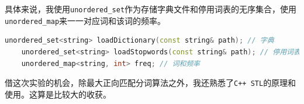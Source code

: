 \documentclass{article}
\begin{document}
具体来说，我使用\texttt{unordered\_set}作为存储字典文件和停用词表的无序集合，使用\texttt{unordered\_map}来一一对应词和该词的频率。

\begin{lstlisting}[language=C++]
	unordered_set<string> loadDictionary(const string& path); // 字典
	unordered_set<string> loadStopwords(const string& path); // 停用词表
	unordered_map<string, int> freq; // 词和频率
\end{lstlisting}

借这次实验的机会，除最大正向匹配分词算法之外，我还熟悉了\texttt{C++ STL}的原理和使用。这算是比较大的收获。
\end{document}
